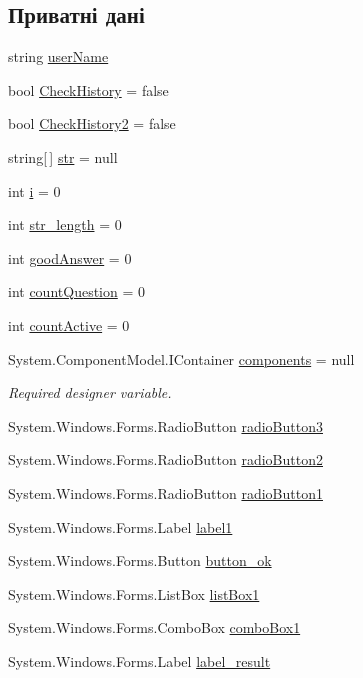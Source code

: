 \subsection*{Приватні дані}
\begin{DoxyCompactItemize}
\item 
string \hyperlink{class_tests_1_1_form2_a94345348b49022de721b18d56a6ee69c}{user\+Name}
\item 
bool \hyperlink{class_tests_1_1_form2_a54e155db1ad24014b42f57316c451c8e}{Check\+History} = false
\item 
bool \hyperlink{class_tests_1_1_form2_a3757cb2e88f63fcddc6eafa8875d8083}{Check\+History2} = false
\item 
string\mbox{[}$\,$\mbox{]} \hyperlink{class_tests_1_1_form2_aac5d2866823577cccc4ca0a8442d2482}{str} = null
\item 
int \hyperlink{class_tests_1_1_form2_ad5c917043831c5e2e149a3f4c97c6bec}{i} = 0
\item 
int \hyperlink{class_tests_1_1_form2_a02950f1d6c4e43ab053c7b7aaeea873c}{str\+\_\+length} = 0
\item 
int \hyperlink{class_tests_1_1_form2_aa3d211b0601b3563a317d4af624ad95a}{good\+Answer} = 0
\item 
int \hyperlink{class_tests_1_1_form2_aa39ae1a993f54362add54ef965ceeb3d}{count\+Question} = 0
\item 
int \hyperlink{class_tests_1_1_form2_aa30b67a81604acf594bc26419d249f6f}{count\+Active} = 0
\item 
System.\+Component\+Model.\+I\+Container \hyperlink{class_tests_1_1_form2_a7d07edf4796d9dc60c94c70eefc79d72}{components} = null
\begin{DoxyCompactList}\small\item\em Required designer variable. \end{DoxyCompactList}\item 
System.\+Windows.\+Forms.\+Radio\+Button \hyperlink{class_tests_1_1_form2_aab1e99a28aeebaacbd56f13e46f7e276}{radio\+Button3}
\item 
System.\+Windows.\+Forms.\+Radio\+Button \hyperlink{class_tests_1_1_form2_a78bbfea2be8bda139a2ee7238c022d9a}{radio\+Button2}
\item 
System.\+Windows.\+Forms.\+Radio\+Button \hyperlink{class_tests_1_1_form2_ad4990affbee8ba8accb2b5aee47fdbca}{radio\+Button1}
\item 
System.\+Windows.\+Forms.\+Label \hyperlink{class_tests_1_1_form2_ad3b2b91e0f3feba4590909a3a7a183b6}{label1}
\item 
System.\+Windows.\+Forms.\+Button \hyperlink{class_tests_1_1_form2_a714a5d57a04e1dabbf37e3ab50da4050}{button\+\_\+ok}
\item 
System.\+Windows.\+Forms.\+List\+Box \hyperlink{class_tests_1_1_form2_a480f63340ce06b249c91e40b327e4ccb}{list\+Box1}
\item 
System.\+Windows.\+Forms.\+Combo\+Box \hyperlink{class_tests_1_1_form2_a2f3916e9df23010161dc15f6d047abae}{combo\+Box1}
\item 
System.\+Windows.\+Forms.\+Label \hyperlink{class_tests_1_1_form2_a8b4c39a636e8f658d2863be6160fc0ec}{label\+\_\+result}
\end{DoxyCompactItemize}



